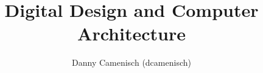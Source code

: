 \documentclass[a4paper]{report}
\title{Digital Design and Computer Architecture}
\author{Danny Camenisch (dcamenisch)}
\begin{document}
\maketitle
\tableofcontents


\begin{comment}

\chapter{Template}
\section{tcolorbox}

\begin{definition}
    Definition...
\end{definition}

\begin{lemma}
    Lemma...
\end{lemma}

\begin{satz}[Satz von Danny]
    Satz...
\end{satz}

\begin{tcolorbox}[colback=dcWhite,colframe=dcOrange,title=\textbf{My Heading}]
    This is a \textbf{tcolorbox}.
\tcblower
    Here, you see the lower part of the box.
\tcbsubtitle{subtitle}
\end{tcolorbox}

\section{minted}

\begin{verbatim}
    // Hello.java
    import javax.swing.JApplet;
    import java.awt.Graphics;
    
    public class Hello extends JApplet {
        public void paintComponent(Graphics g) {
            g.drawString("Hello, world!", 65, 95);
        }    
    }
\end{verbatim}



%

\end{comment}





\end{document}
